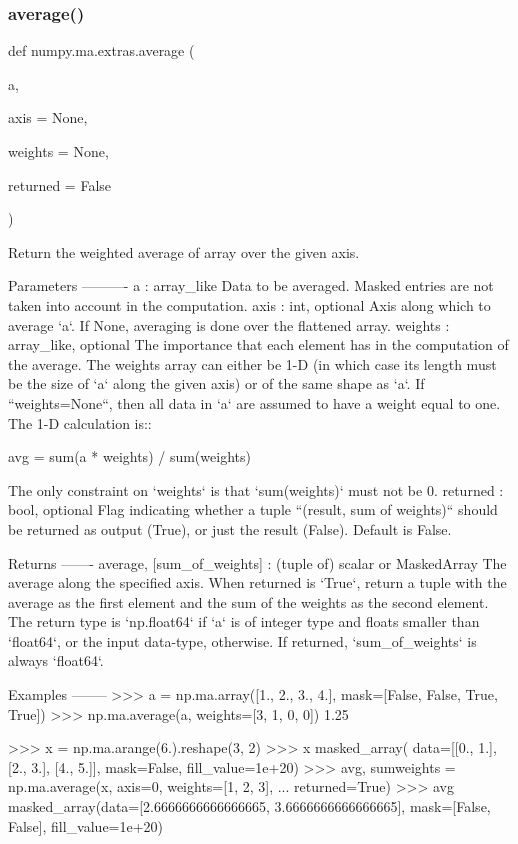 \subsubsection{\texorpdfstring{average()}{average()}}
{\footnotesize\ttfamily def numpy.\+ma.\+extras.\+average (\begin{DoxyParamCaption}\item[{}]{a,  }\item[{}]{axis = {\ttfamily None},  }\item[{}]{weights = {\ttfamily None},  }\item[{}]{returned = {\ttfamily False} }\end{DoxyParamCaption})}

\begin{DoxyVerb}Return the weighted average of array over the given axis.

Parameters
----------
a : array_like
    Data to be averaged.
    Masked entries are not taken into account in the computation.
axis : int, optional
    Axis along which to average `a`. If None, averaging is done over
    the flattened array.
weights : array_like, optional
    The importance that each element has in the computation of the average.
    The weights array can either be 1-D (in which case its length must be
    the size of `a` along the given axis) or of the same shape as `a`.
    If ``weights=None``, then all data in `a` are assumed to have a
    weight equal to one.  The 1-D calculation is::

        avg = sum(a * weights) / sum(weights)

    The only constraint on `weights` is that `sum(weights)` must not be 0.
returned : bool, optional
    Flag indicating whether a tuple ``(result, sum of weights)``
    should be returned as output (True), or just the result (False).
    Default is False.

Returns
-------
average, [sum_of_weights] : (tuple of) scalar or MaskedArray
    The average along the specified axis. When returned is `True`,
    return a tuple with the average as the first element and the sum
    of the weights as the second element. The return type is `np.float64`
    if `a` is of integer type and floats smaller than `float64`, or the
    input data-type, otherwise. If returned, `sum_of_weights` is always
    `float64`.

Examples
--------
>>> a = np.ma.array([1., 2., 3., 4.], mask=[False, False, True, True])
>>> np.ma.average(a, weights=[3, 1, 0, 0])
1.25

>>> x = np.ma.arange(6.).reshape(3, 2)
>>> x
masked_array(
  data=[[0., 1.],
        [2., 3.],
        [4., 5.]],
  mask=False,
  fill_value=1e+20)
>>> avg, sumweights = np.ma.average(x, axis=0, weights=[1, 2, 3],
...                                 returned=True)
>>> avg
masked_array(data=[2.6666666666666665, 3.6666666666666665],
             mask=[False, False],
       fill_value=1e+20)\end{DoxyVerb}
 \mbox{\label{namespacenumpy_1_1ma_1_1extras_ab14418e8e898ae8d4a9e4540d7d896c2}} 
